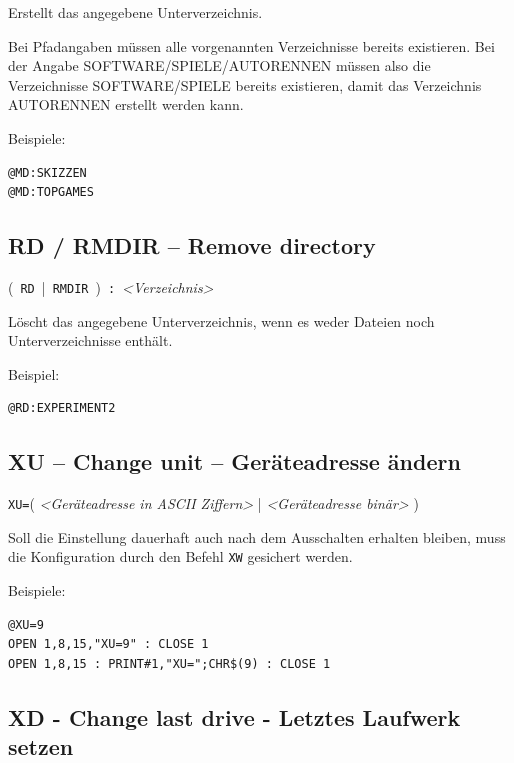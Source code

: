 \documentclass[10pt,a4paper]{scrartcl}		%
\begin{document}
Erstellt das angegebene Unterverzeichnis. 

Bei Pfadangaben müssen
alle vorgenannten Verzeichnisse bereits existieren. Bei der
Angabe SOFTWARE/SPIELE/AUTORENNEN müssen also die Verzeichnisse
SOFTWARE/SPIELE bereits existieren, damit das Verzeichnis AUTORENNEN 
erstellt werden kann.

Beispiele:
\begin{verbatim}
@MD:SKIZZEN
@MD:TOPGAMES
\end{verbatim}



\subsection{RD / RMDIR -- Remove directory}

\mbox{\Big( \texttt{RD} \Big| \texttt{RMDIR} \Big) 
\texttt{:} \textit{<Verzeichnis>}}

Löscht das angegebene Unterverzeichnis, wenn es weder
Dateien noch Unterverzeichnisse enthält.

Beispiel:
\begin{verbatim}
@RD:EXPERIMENT2
\end{verbatim}


\label{xcommands}

\subsection{XU -- Change unit -- Geräteadresse ändern}


\texttt{XU=}\Big( \textit{<Geräteadresse in ASCII Ziffern>} \Big|
\textit{<Geräteadresse binär>} \Big)

Soll die Einstellung dauerhaft auch nach dem Ausschalten erhalten 
bleiben, muss die Konfiguration durch den Befehl \texttt{XW} gesichert werden.

Beispiele:

\begin{verbatim}
@XU=9
OPEN 1,8,15,"XU=9" : CLOSE 1
OPEN 1,8,15 : PRINT#1,"XU=";CHR$(9) : CLOSE 1
\end{verbatim}

\subsection{XD - Change last drive - Letztes Laufwerk setzen}
\end{document}
